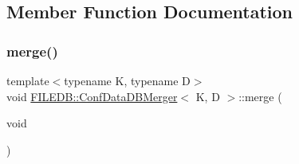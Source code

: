 \subsection{Member Function Documentation}
\mbox{\label{classFILEDB_1_1ConfDataDBMerger_a6738f9880645518ba94eccd3b2037f24}} 
\subsubsection{\texorpdfstring{merge()}{merge()}\hspace{0.1cm}{\footnotesize\ttfamily [1/3]}}
{\footnotesize\ttfamily template$<$typename K, typename D$>$ \\
void \mbox{\hyperlink{classFILEDB_1_1ConfDataDBMerger}{F\+I\+L\+E\+D\+B\+::\+Conf\+Data\+D\+B\+Merger}}$<$ K, D $>$\+::merge (\begin{DoxyParamCaption}\item[{void}]{ }\end{DoxyParamCaption})\hspace{0.3cm}{\ttfamily [inline]}}

